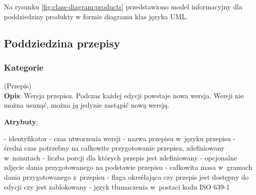 Na rysunku \ref{fig:class-diagram:products} przedstawiono model informacyjny dla poddziedziny produkty w formie diagramu klas języka UML.


\subsection{Poddziedzina przepisy}\label{subsec:database:recipes}

\subsubsection{Kategorie}\label{subsubsec:database:recipes:categories}
\begin{enumerate}[label={\textbf{KAT/3/\protect\twodigits{\theenumi}}}, wide, labelwidth=!, labelindent=0pt, labelsep=0pt, series=reqs]
    \setlength\itemsep{1.75em}
    \label{kat:Recipe} (Przepis)\\
    \indent\textbf{Opis}: Wersja przepisu. Podczas każdej edycji powstaje nowa wersja. Wersji nie można usunąć, można ją jedynie zastąpić nową wersją.
    \par
    \textbf{Atrybuty}:
    \begin{itemize}[series=atr, wide, align=left, leftmargin=190pt]
        \label{kat:Recipe:id}- identyfikator
        \label{kat:Recipe:editTimestamp}- czas utworzenia wersji
        \label{kat:Recipe:name}- nazwa przepisu w~języku przepisu
        \label{kat:Recipe:preparationTimeMinutes}- średni czas potrzebny na całkowite przygotowanie przepisu, zdefiniowany w~minutach
        \label{kat:Recipe:numberOfPortions}- liczba porcji dla których przepis jest zdefiniowany
        \label{kat:Recipe:image}- opcjonalne zdjęcie dania przygotowanego na podstawie przepisu
        \label{kat:Recipe:totalGramsWeight}- całkowita masa w~gramach dania przygotowanego z~przepisu
        \label{kat:Recipe:isFinal}- flaga określająca czy przepis jest dostępny do edycji czy jest zablokowany
        \label{kat:Recipe:language}- język tłumaczenia w~postaci kodu ISO 639-1
    \end{itemize}


\end{enumerate}
